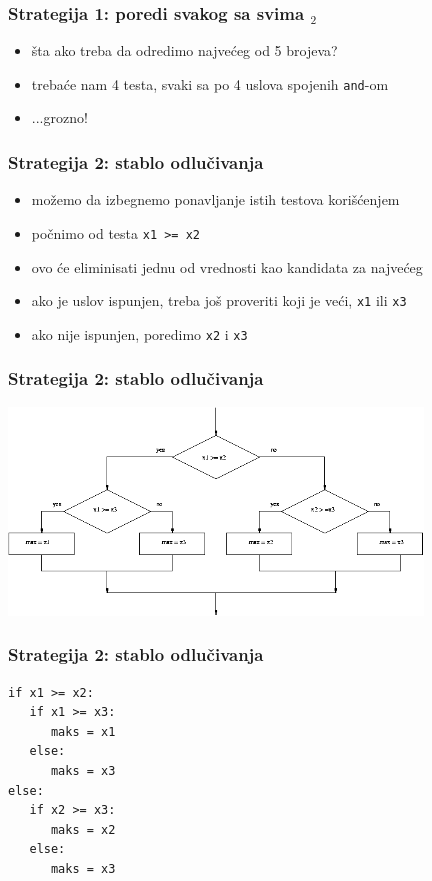 \documentclass[utf8,compress,aspectratio=169]{beamer}
\begin{document}
\begin{frame}[fragile]
  \frametitle{Strategija 1: poredi svakog sa svima $_2$}
  \begin{itemize}
    \item šta ako treba da odredimo najvećeg od 5 brojeva?
    \item trebaće nam 4 testa, svaki sa po 4 uslova spojenih \texttt{and}-om
    \item ...grozno!
  \end{itemize}
\end{frame}

\begin{frame}[fragile]
  \frametitle{Strategija 2: stablo odlučivanja}
  \begin{itemize}
    \item možemo da izbegnemo ponavljanje istih testova korišćenjem 
    \item počnimo od testa \texttt{x1 >= x2}
    \item ovo će eliminisati jednu od vrednosti kao kandidata za najvećeg
    \item ako je uslov ispunjen, treba još proveriti koji je veći, \texttt{x1} ili \texttt{x3}
    \item ako nije ispunjen, poredimo \texttt{x2} i \texttt{x3}
  \end{itemize}
\end{frame}

\begin{frame}[fragile]
  \frametitle{Strategija 2: stablo odlučivanja}
\begin{center}
  \includegraphics[width=11cm]{pic17}
\end{center}
\end{frame}

\begin{frame}[fragile]
  \frametitle{Strategija 2: stablo odlučivanja}
\begin{verbatim}
if x1 >= x2:
   if x1 >= x3:
      maks = x1
   else:
      maks = x3
else:
   if x2 >= x3:
      maks = x2
   else:
      maks = x3
\end{verbatim}
\end{frame}
\end{document}
